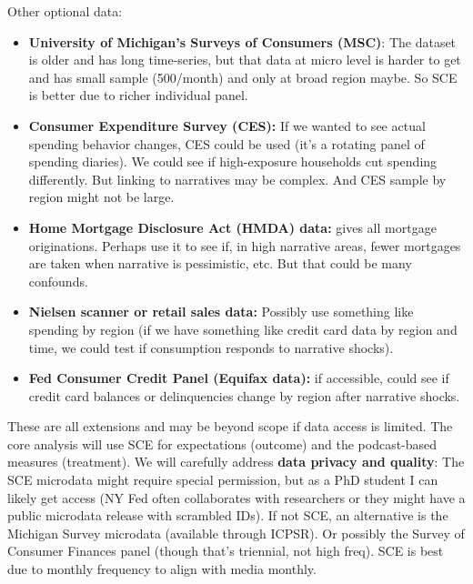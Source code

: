 \documentclass[12pt]{article}
\begin{document}
Other optional data:
\begin{itemize}
    \item \textbf{University of Michigan's Surveys of Consumers (MSC)}: The dataset is older and has long time-series, but that data at micro level is harder to get and has small sample (500/month) and only at broad region maybe. So SCE is better due to richer individual panel.
    \item \textbf{Consumer Expenditure Survey (CES):} If we wanted to see actual spending behavior changes, CES could be used (it's a rotating panel of spending diaries). We could see if high-exposure households cut spending differently. But linking to narratives may be complex. And CES sample by region might not be large.
    \item \textbf{Home Mortgage Disclosure Act (HMDA) data:} gives all mortgage originations. Perhaps use it to see if, in high narrative areas, fewer mortgages are taken when narrative is pessimistic, etc. But that could be many confounds.
    \item \textbf{Nielsen scanner or retail sales data:} Possibly use something like spending by region (if we have something like credit card data by region and time, we could test if consumption responds to narrative shocks).
    \item \textbf{Fed Consumer Credit Panel (Equifax data):} if accessible, could see if credit card balances or delinquencies change by region after narrative shocks.
\end{itemize}

These are all extensions and may be beyond scope if data access is limited. The core analysis will use SCE for expectations (outcome) and the podcast-based measures (treatment).
We will carefully address \textbf{data privacy and quality}: The SCE microdata might require special permission, but as a PhD student I can likely get access (NY Fed often collaborates with researchers or they might have a public microdata release with scrambled IDs). If not SCE, an alternative is the Michigan Survey microdata (available through ICPSR). Or possibly the Survey of Consumer Finances panel (though that's triennial, not high freq). SCE is best due to monthly frequency to align with media monthly.
\end{document}
